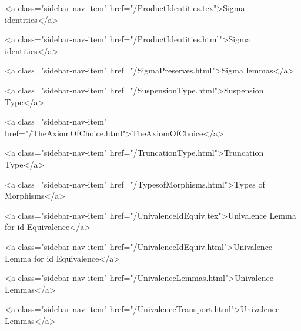       
    
      
        
          <a class="sidebar-nav-item" href="/ProductIdentities.tex">Sigma identities</a>
        
      
    
      
        
          <a class="sidebar-nav-item" href="/ProductIdentities.html">Sigma identities</a>
        
      
    
      
        
          <a class="sidebar-nav-item" href="/SigmaPreserves.html">Sigma lemmas</a>
        
      
    
      
        
          <a class="sidebar-nav-item" href="/SuspensionType.html">Suspension Type</a>
        
      
    
      
        
          <a class="sidebar-nav-item" href="/TheAxiomOfChoice.html">TheAxiomOfChoice</a>
        
      
    
      
        
          <a class="sidebar-nav-item" href="/TruncationType.html">Truncation Type</a>
        
      
    
      
        
          <a class="sidebar-nav-item" href="/TypesofMorphisms.html">Types of Morphisms</a>
        
      
    
      
        
          <a class="sidebar-nav-item" href="/UnivalenceIdEquiv.tex">Univalence Lemma for id Equivalence</a>
        
      
    
      
        
          <a class="sidebar-nav-item" href="/UnivalenceIdEquiv.html">Univalence Lemma for id Equivalence</a>
        
      
    
      
        
          <a class="sidebar-nav-item" href="/UnivalenceLemmas.html">Univalence Lemmas</a>
        
      
    
      
        
          <a class="sidebar-nav-item" href="/UnivalenceTransport.html">Univalence Lemmas</a>
        
